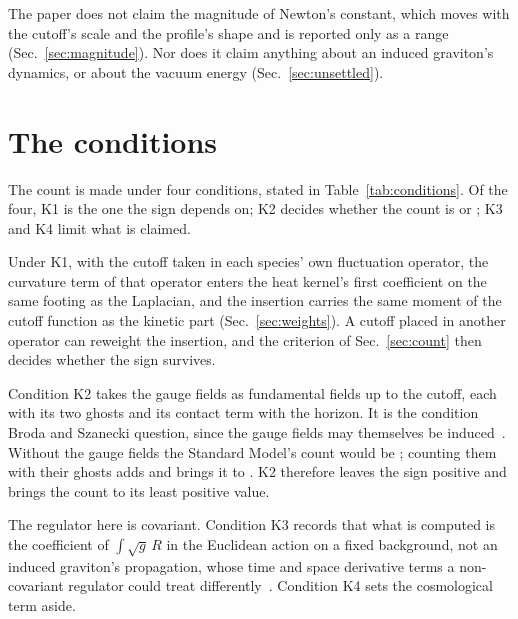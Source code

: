 \documentclass[aps,prd,reprint,amsmath,amssymb,superscriptaddress,nofootinbib]{revtex4-2}
\begin{document}
The paper does not claim the magnitude of Newton's constant, which moves with the
cutoff's scale and the profile's shape and is reported only as a range
(Sec.~\ref{sec:magnitude}). Nor does it claim anything about an induced graviton's
dynamics, or about the vacuum energy (Sec.~\ref{sec:unsettled}).

\section{The conditions}
\label{sec:conditions}

The count is made under four conditions, stated in Table~\ref{tab:conditions}. Of
the four, K1 is the one the sign depends on; K2 decides whether the count is
\smNetWithoutGauge{} or \smNet; K3 and K4 limit what is claimed.

\begin{table}
\caption{The conditions the count is made under.}
\label{tab:conditions}
\centering

\end{table}

Under K1, with the cutoff taken in each species' own fluctuation operator, the
curvature term of that operator enters the heat kernel's first coefficient on the
same footing as the Laplacian, and the insertion carries the same moment of the
cutoff function as the kinetic part (Sec.~\ref{sec:weights}). A cutoff placed in
another operator can reweight the insertion, and the criterion of
Sec.~\ref{sec:count} then decides whether the sign survives.

Condition K2 takes the gauge fields as fundamental fields up to the cutoff, each with
its two ghosts and its contact term with the horizon. It is the condition Broda and
Szanecki question, since the gauge fields may themselves be
induced~\cite{BrodaSzanecki2009}. Without the gauge fields the Standard Model's count
would be \smNetWithoutGauge{}; counting them with their ghosts adds \smGaugeSector{}
and brings it to \smNet{}. K2 therefore leaves the sign positive and brings the count
to its least positive value.

The regulator here is covariant. Condition K3 records that what is computed is the
coefficient of $\int\!\sqrt g\,R$ in the Euclidean action on a fixed background, not
an induced graviton's propagation, whose time and space derivative terms a
non-covariant regulator could treat differently~\cite{Visser2002}. Condition K4 sets
the cosmological term aside.
\end{document}

